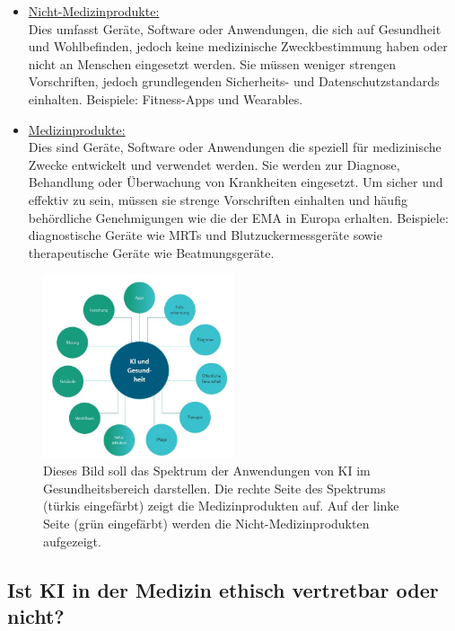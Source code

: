 \documentclass{report}
\begin{document}
\begin{itemize}
\item \underline{Nicht-Medizinprodukte:}\\ Dies umfasst Geräte, Software oder Anwendungen, die sich
auf Gesundheit und Wohlbefinden, jedoch keine medizinische Zweckbestimmung haben oder nicht an Menschen 
eingesetzt werden. Sie müssen weniger strengen Vorschriften, jedoch grundlegenden Sicherheits- und Datenschutzstandards
einhalten. Beispiele: Fitness-Apps und Wearables.
\item \underline{Medizinprodukte:} \\Dies sind Geräte, Software oder Anwendungen die speziell für medizinische Zwecke 
entwickelt und verwendet werden. Sie werden zur Diagnose, Behandlung oder Überwachung von Krankheiten eingesetzt.
Um sicher und effektiv zu sein, müssen sie strenge Vorschriften einhalten und häufig behördliche Genehmigungen wie die der EMA 
in Europa erhalten. Beispiele: diagnostische Geräte wie MRTs und Blutzuckermessgeräte sowie therapeutische Geräte
wie Beatmungsgeräte.
\end{itemize}

\begin{figure}[H]
    \centering
    \includegraphics[width=0.50\textwidth]{Bild13.jpg}
    \caption{Dieses Bild soll das Spektrum der Anwendungen von KI im Gesundheitsbereich darstellen. Die rechte Seite des Spektrums (türkis eingefärbt)
    zeigt die Medizinprodukten auf. Auf der linke Seite (grün eingefärbt) werden die Nicht-Medizinprodukten aufgezeigt.}
    \label{fig:Bildmedizin}
\end{figure}

\newpage
\subsection {Ist KI in der Medizin ethisch vertretbar oder nicht?}
\end{document}

